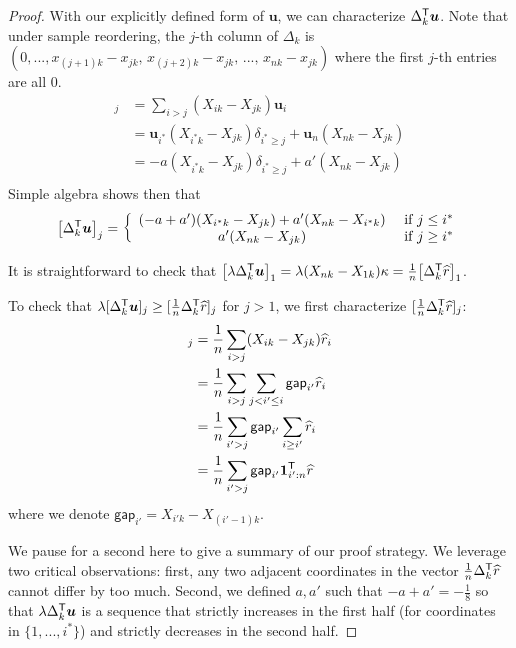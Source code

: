 \documentclass[12pt,pdftex,aos,noinfoline,addressasfootnote]{imsart}
\begin{document}
\begin{proof}
With our explicitly defined form of $\mathbf{u}$, we can characterize $\Delta_k^{\mathsf{T}} \mbox{\boldmath $u$}$. Note that under sample reordering, the $j$-th column of $\Delta_k$ is $(0, ..., x_{(j+1)k} - x_{jk},\, x_{(j+2)k} - x_{jk},\, ...,\, x_{nk} - x_{jk} )$ where the first $j$-th entries are all 0. 
\begin{align*}
[\Delta_k^\tran \mathbf{u}]_j &= \sum_{i > j} (X_{ik} - X_{jk}) \mathbf{u}_i \\
  &= \mathbf{u}_{i^*} (X_{i^*k} - X_{jk}) \delta_{i^* \geq j} + \mathbf{u}_n (X_{nk} - X_{jk})\\ 
  &= -a (X_{i^*k} - X_{jk}) \delta_{i^* \geq j} + a' (X_{nk} - X_{jk}) \\
\end{align*}
Simple algebra shows then that
\begin{align}
\big[ \Delta_k^{\mathsf{T}} \mbox{\boldmath $u$} \big]_j = 
  \left \{ \begin{array}{cc} 
   (-a + a')(X_{i^*k} - X_{jk})+ a'(X_{nk} - X_{ i^*k})
   & \textrm{ if } j \leq i^* \\
   a'(X_{nk} - X_{jk}) & \textrm{ if } j \geq i^* 
     \end{array} \right.
\end{align} 

It is straightforward to check that $\big[ \lambda \Delta_k^{\mathsf{T}} \mbox{\boldmath $u$} \big]_1 = \lambda (X_{nk} - X_{1k}) \kappa = \frac{1}{n} \big[ \Delta_k^{\mathsf{T}} \widehat{r} \big]_1$.

To check that $\lambda [ \Delta_k^{\mathsf{T}} \mbox{\boldmath $u$} ]_j \geq [ \frac{1}{n} \Delta_k^{\mathsf{T}} \widehat{r}]_j$ for $j > 1$, we first characterize $[\frac{1}{n} \Delta_k^{\mathsf{T}} \widehat{r}]_j$:
\begin{align*}
[\frac{1}{n} \Delta_k^\tran \hat{r}]_j &= \frac{1}{n} \sum_{i > j} (X_{ik} - X_{jk}) \hat{r}_i \\
  & = \frac{1}{n} \sum_{i > j} \sum_{j < i' \leq i} \mathsf{gap}_{i'} \hat{r}_i \\
 & = \frac{1}{n} \sum_{i' > j} \mathsf{gap}_{i'} \sum_{i \geq i'} \hat{r}_i \\
 & = \frac{1}{n} \sum_{i' > j} \mathsf{gap}_{i'} \mathbf{1}_{i':n}^\tran \hat{r} 
\end{align*}
where we denote $\mathsf{gap}_{i'} = X_{i'k} - X_{(i'-1)k}$.

We pause for a second here to give a summary of our proof strategy. We leverage two critical observations: first, any two adjacent coordinates in the vector $\frac{1}{n} \Delta_k^{\mathsf{T}} \widehat{r}$ cannot differ by too much. Second, we defined $a, a'$ such that $-a+a' = -\frac{1}{8}$ so that $\lambda \Delta_k^{\mathsf{T}} \mbox{\boldmath $u$}$ is a sequence that strictly increases in the first half (for coordinates in $\{1,...,i^*\}$) and strictly decreases in the second half. 


\end{proof}
\end{document}

